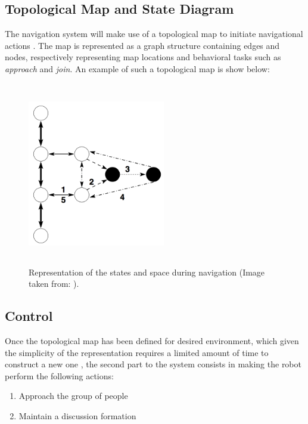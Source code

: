 \subsection{Topological Map and State Diagram}

The navigation system will make use of a topological map to initiate navigational actions \cite{paper:JOINDISCUSSION}. The map is represented as a graph structure containing edges and nodes, respectively representing map locations and behavioral tasks such as \textit{approach} and \textit{join}. An example of such a topological map is show below:

\begin{figure}[!htbp]
\begin{center}
\includegraphics[width=6cm,height=8cm,keepaspectratio]{images/topological.png}
\end{center}
\caption{Representation of the states and space during navigation (Image taken from: \cite{paper:JOINDISCUSSION}).}
\end{figure}

\subsection{Control}

Once the topological map has been defined for desired environment, which given the simplicity of the representation requires a limited amount of time to construct a new one \cite{paper:JOINDISCUSSION}, the second part to the system consists in making the robot perform the following actions:

\begin{enumerate}
  \item Approach the group of people
  \item Maintain a discussion formation
\end{enumerate}

